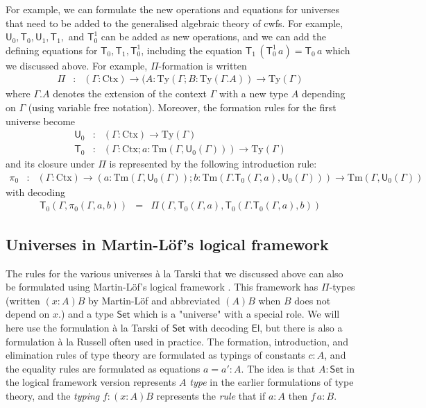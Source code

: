\documentclass[11pt,a4paper]{article}
\def\UU{\mathsf{U}}
\newcommand{\Set}{\mathsf{Set}}
\newcommand{\El}{\mathsf{El}}
\newcommand{\T}{\mathsf{T}}
\def\Ctx{\mathrm{Ctx}}
\def\Ty{\mathrm{Ty}}
\def\Tm{\mathrm{Tm}}
\begin{document}
For example, we can formulate the new operations and equations for universes that need to be added to the generalised algebraic theory of cwfs. For example, $\UU_0,\T_0,\UU_1, \T_1,$ and $\T_0^1$ can be added as new operations, and we can add the defining equations for $\T_0, \T_1,\T_0^1$, including the equation
$
\T_1\, (\T_0^1\, a) = \T_0\, a
$
which we discussed above.
For example, $\Pi$-formation is written
\begin{eqnarray*}
\Pi&: &(\Gamma : \Ctx) \to (A : \Ty(\Gamma; B : \Ty(\Gamma.A)) \to\Ty(\Gamma)
\end{eqnarray*}
where $\Gamma.A$ denotes the extension of the context $\Gamma$ with a new type $A$ depending on $\Gamma$ (using variable free notation). Moreover, the formation rules for the first universe become
\begin{eqnarray*}
\UU_0 &: &(\Gamma : \Ctx) \to \Ty(\Gamma)\\
\T_0 &: &(\Gamma : \Ctx ; a : \Tm(\Gamma,\UU_0(\Gamma)))\to \Ty(\Gamma)
\end{eqnarray*}
and its closure under $\Pi$ is represented by the following introduction rule:
\begin{eqnarray*}
\pi_0&: &(\Gamma : \Ctx) \to (a : \Tm(\Gamma,\UU_0(\Gamma)); b : \Tm(\Gamma.\T_0(\Gamma,a),\UU_0(\Gamma))) \to\Tm(\Gamma,\UU_0(\Gamma))
\end{eqnarray*}
with decoding
\begin{eqnarray*}
\T_0(\Gamma,\pi_0(\Gamma,a,b)) &=& \Pi(\Gamma,\T_0(\Gamma,a), \T_0(\Gamma.\T_0(\Gamma,a),b))
\end{eqnarray*}

\subsection{Universes in Martin-Löf's logical framework}

The rules for the various universes \`a la Tarski that we discussed above can also be formulated using Martin-Löf's logical framework \cite{Martinlof86,NordstromPS90}. This framework has $\Pi$-types (written $(x : A)B$ by Martin-Löf and abbreviated $(A)B$ when $B$ does not depend on $x$.) and a type $\Set$ which is a "universe" with a special role. We will here use the formulation \`a la Tarski of $\Set$ with decoding $\El$, but there is also a formulation \`a la Russell often used in practice. The formation, introduction, and elimination rules of type theory are formulated as typings of constants $c : A$, and the equality rules are formulated as equations $a = a' : A$. The idea is that $A : \Set$ in the logical framework version represents $A$ {\em type} in the earlier formulations of type theory, and the {\em typing} $f : (x : A)B$ represents the {\em rule} that if $a : A$ then $f\,a : B$.
\end{document}
